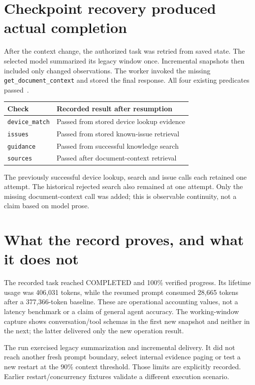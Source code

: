 \section*{Checkpoint recovery produced actual completion}
After the context change, the authorized task was retried from saved state. The selected model summarized its legacy window once. Incremental snapshots then included only changed observations. The worker invoked the missing \texttt{get\_document\_context} and stored the final response. All four existing predicates passed~\cite{contextrecord}.
\begin{tabularx}{\linewidth}{@{}lX@{}}\toprule
Check & Recorded result after resumption\\\midrule
\texttt{device\_match} & Passed from stored device lookup evidence\\
\texttt{issues} & Passed from stored known-issue retrieval\\
\texttt{guidance} & Passed from successful knowledge search\\
\texttt{sources} & Passed after document-context retrieval\\\bottomrule
\end{tabularx}
The previously successful device lookup, search and issue calls each retained one attempt. The historical rejected search also remained at one attempt. Only the missing document-context call was added; this is observable continuity, not a claim based on model prose.
\section*{What the record proves, and what it does not}
The recorded task reached COMPLETED and 100\% verified progress. Its lifetime usage was 406,031 tokens, while the resumed prompt consumed 28,665 tokens after a 377,366-token baseline. These are operational accounting values, not a latency benchmark or a claim of general agent accuracy. The working-window capture shows conversation/tool schemas in the first new snapshot and neither in the next; the latter delivered only the new operation result.

The run exercised legacy summarization and incremental delivery. It did not reach another fresh prompt boundary, select internal evidence paging or test a new restart at the 90\% context threshold. Those limits are explicitly recorded. Earlier restart/concurrency fixtures validate a different execution scenario.
